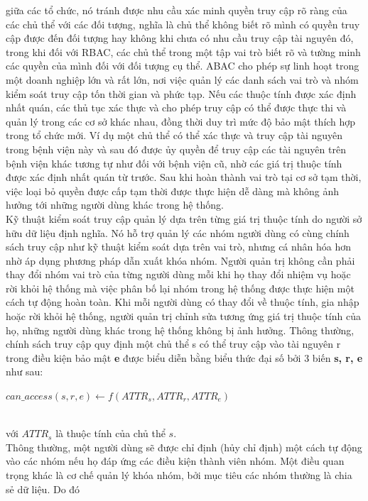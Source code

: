 giữa các tổ chức, nó tránh được nhu cầu xác minh quyền truy cập rõ ràng của các chủ
thể với các đối tượng, nghĩa là chủ thể không biết rõ mình có quyền truy cập được đến
đối tượng hay không khi chưa có nhu cầu truy cập tài nguyên đó, trong khi đối với
RBAC, các chủ thể trong một tập vai trò biết rõ và tường minh các quyền của mình đối
với đối tượng cụ thể. ABAC cho phép sự linh hoạt trong một doanh nghiệp lớn và rất
lớn, nơi việc quản lý các danh sách vai trò và nhóm kiểm soát truy cập tốn thời gian và
phức tạp. Nếu các thuộc tính được xác định nhất quán, các thủ tục xác thực và cho phép
truy cập có thể được thực thi và quản lý trong các cơ sở khác nhau, đồng thời duy trì
mức độ bảo mật thích hợp trong tổ chức mới. Ví dụ một chủ thể có thể xác thực và truy
cập tài nguyên trong bệnh viện này và sau đó được ủy quyền để truy cập các tài nguyên
trên bệnh viện khác tương tự như đối với bệnh viện cũ, nhờ các giá trị thuộc tính được
xác định nhất quán từ trước. Sau khi hoàn thành vai trò tại cơ sở tạm thời, việc loại bỏ quyền được cấp tạm thời được thực hiện dễ dàng mà không ảnh hưởng tới những người
dùng khác trong hệ thống. \\
\indent Kỹ thuật kiểm soát truy cập quản lý dựa trên từng giá trị thuộc tính do người sở
hữu dữ liệu định nghĩa. Nó hỗ trợ quản lý các nhóm người dùng có cùng chính sách truy
cập như kỹ thuật kiểm soát dựa trên vai trò, nhưng cá nhân hóa hơn nhờ áp dụng phương
pháp dẫn xuất khóa nhóm. Người quản trị không cần phải thay đổi nhóm vai trò của từng
người dùng mỗi khi họ thay đổi nhiệm vụ hoặc rời khỏi hệ thống mà việc phân bố lại
nhóm trong hệ thống được thực hiện một cách tự động hoàn toàn. Khi mỗi người dùng
có thay đổi về thuộc tính, gia nhập hoặc rời khỏi hệ thống, người quản trị chỉnh sửa
tương ứng giá trị thuộc tính của họ, những người dùng khác trong hệ thống không bị ảnh
hưởng. Thông thường, chính sách truy cập quy định một chủ thể s có thể truy cập vào
tài nguyên r trong điều kiện bảo mật \textbf{e} được biểu diễn bằng biểu thức đại số bởi 3 biến \textbf{s, r, e} như sau:
\begin{center}
$can\_access(s, r, e) \leftarrow f(ATTR_{s},ATTR_{r}, ATTR_{e})$ \cite{yuan2005attributed}
\end{center}\\ với $ATTR_{s}$ là thuộc tính của chủ thể $s$. \\
\indent Thông thường, một người dùng sẽ được chỉ định (hủy chỉ định) một cách tự động
vào các nhóm nếu họ đáp ứng các điều kiện thành viên nhóm. Một điều quan trọng khác
là cơ chế quản lý khóa nhóm, bởi mục tiêu các nhóm thường là chia sẻ dữ liệu. Do đó
